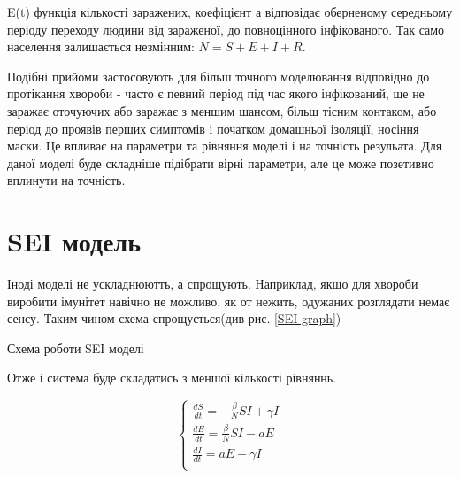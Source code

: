 E(t) функція кількості заражених, коефіцієнт а відповідає оберненому середньому періоду переходу людини від зараженої, до повноцінного інфікованого.
Так само населення залишається незмінним: $ N = S + E + I + R $.

Подібні прийоми застосовують для більш точного моделювання відповідно до
протікання хвороби - часто є певний період під час якого інфікований, 
ще не заражає оточуючих або заражає з меншим шансом, більш тісним контаком, 
або період до проявів перших симптомів і початком домашньої ізоляції,
носіння маски. 
Це впливає на параметри та рівняння моделі і на точність резульата. 
Для даної моделі буде складніше підібрати вірні параметри, 
але це може позетивно вплинути на точність.

\section{SEI модель}

Іноді моделі не ускладнюютть, а спрощують. 
Наприклад, якщо для хвороби виробити імунітет навічно не можливо, 
як от нежить, одужаних розглядати немає сенсу. 
Таким чином схема спрощується(див рис. \ref{SEI graph})

\begin{risunok}[ht]
    \centering
    \vspace{0.5cm}
    \caption{Схема роботи SEI моделі}
    \label{SEI graph}
\end{risunok}

Отже і система буде складатись з меншої кількості рівняннь.

\begin{equation*}
    \begin{cases}
        \frac{dS}{dt} = - \frac{\beta}{N}SI + \gamma I \\
        \frac{dE}{dt} = \frac{\beta}{N}SI - aE         \\
        \frac{dI}{dt} = aE - \gamma I                  \\
    \end{cases}
\end{equation*}

